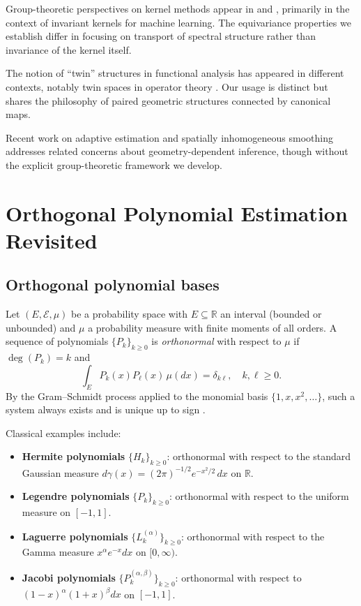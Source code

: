 \documentclass[11pt,a4paper]{article}
\newcommand{\R}{\mathbb{R}}
\begin{document}
Group-theoretic perspectives on kernel methods appear in \citet{Kondor2008} and \citet{Fukumizu2009}, primarily in the context of invariant kernels for machine learning. The equivariance properties we establish differ in focusing on transport of spectral structure rather than invariance of the kernel itself.

The notion of ``twin'' structures in functional analysis has appeared in different contexts, notably twin spaces in operator theory \citep{Halmos1982}. Our usage is distinct but shares the philosophy of paired geometric structures connected by canonical maps.

Recent work on adaptive estimation \citep{Lepski1997,Goldenshluger2011} and spatially inhomogeneous smoothing \citep{Fan1996} addresses related concerns about geometry-dependent inference, though without the explicit group-theoretic framework we develop.

\section{Orthogonal Polynomial Estimation Revisited}\label{sec:orthopoly}

\subsection{Orthogonal polynomial bases}

Let $(E, \mathcal{E}, \mu)$ be a probability space with $E \subseteq \R$ an interval (bounded or unbounded) and $\mu$ a probability measure with finite moments of all orders. A sequence of polynomials $\{P_k\}_{k \geq 0}$ is \emph{orthonormal} with respect to $\mu$ if $\deg(P_k) = k$ and
\[
\int_E P_k(x) P_\ell(x) \, \mu(dx) = \delta_{k\ell}, \quad k, \ell \geq 0.
\]
By the Gram--Schmidt process applied to the monomial basis $\{1, x, x^2, \ldots\}$, such a system always exists and is unique up to sign \citep{Szego1975}.

Classical examples include:
\begin{itemize}
\item \textbf{Hermite polynomials} $\{H_k\}_{k \geq 0}$: orthonormal with respect to the standard Gaussian measure $d\gamma(x) = (2\pi)^{-1/2} e^{-x^2/2} \, dx$ on $\R$.
\item \textbf{Legendre polynomials} $\{P_k\}_{k \geq 0}$: orthonormal with respect to the uniform measure on $[-1, 1]$.
\item \textbf{Laguerre polynomials} $\{L_k^{(\alpha)}\}_{k \geq 0}$: orthonormal with respect to the Gamma measure $x^\alpha e^{-x} dx$ on $[0, \infty)$.
\item \textbf{Jacobi polynomials} $\{P_k^{(\alpha,\beta)}\}_{k \geq 0}$: orthonormal with respect to $(1-x)^\alpha (1+x)^\beta dx$ on $[-1, 1]$.
\end{itemize}
\end{document}
